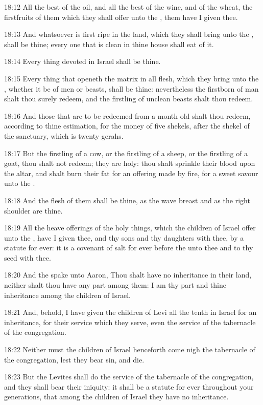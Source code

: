 18:12 All the best of the oil, and all the best of the wine, and of the wheat, the firstfruits of them which they shall offer unto the \LORD, them have I given thee.

18:13 And whatsoever is first ripe in the land, which they shall bring unto the \LORD, shall be thine; every one that is clean in thine house shall eat of it.

18:14 Every thing devoted in Israel shall be thine.

18:15 Every thing that openeth the matrix in all flesh, which they bring unto the \LORD, whether it be of men or beasts, shall be thine: nevertheless the firstborn of man shalt thou surely redeem, and the firstling of unclean beasts shalt thou redeem.

18:16 And those that are to be redeemed from a month old shalt thou redeem, according to thine estimation, for the money of five shekels, after the shekel of the sanctuary, which is twenty gerahs.

18:17 But the firstling of a cow, or the firstling of a sheep, or the firstling of a goat, thou shalt not redeem; they are holy: thou shalt sprinkle their blood upon the altar, and shalt burn their fat for an offering made by fire, for a sweet savour unto the \LORD.

18:18 And the flesh of them shall be thine, as the wave breast and as the right shoulder are thine.

18:19 All the heave offerings of the holy things, which the children of Israel offer unto the \LORD, have I given thee, and thy sons and thy daughters with thee, by a statute for ever: it is a covenant of salt for ever before the \LORD unto thee and to thy seed with thee.

18:20 And the \LORD spake unto Aaron, Thou shalt have no inheritance in their land, neither shalt thou have any part among them: I am thy part and thine inheritance among the children of Israel.

18:21 And, behold, I have given the children of Levi all the tenth in Israel for an inheritance, for their service which they serve, even the service of the tabernacle of the congregation.

18:22 Neither must the children of Israel henceforth come nigh the tabernacle of the congregation, lest they bear sin, and die.

18:23 But the Levites shall do the service of the tabernacle of the congregation, and they shall bear their iniquity: it shall be a statute for ever throughout your generations, that among the children of Israel they have no inheritance.


